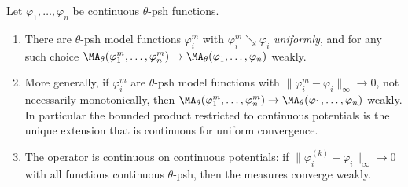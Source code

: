 \begin{proposition}
\label{prop:ch24-continuous-uniform}
Let \(\varphi_1,\ldots,\varphi_n\) be continuous \(\theta\)-psh functions.
\begin{enumerate}
\item\label{itm:ch24-cu:seq} There are \(\theta\)-psh model functions
 \(\varphi_i^m\) with \(\varphi_i^m\searrow\varphi_i\) \emph{uniformly}, and
 for any such choice
 \(\MA_\theta(\varphi_1^m,\ldots,\varphi_n^m)\to
   \MA_\theta(\varphi_1,\ldots,\varphi_n)\) weakly.
\item\label{itm:ch24-cu:unif} More generally, if \(\varphi_i^m\) are
 \(\theta\)-psh model functions with
 \(\|\varphi_i^m-\varphi_i\|_\infty\to0\), not necessarily monotonically,
 then \(\MA_\theta(\varphi_1^m,\ldots,\varphi_n^m)\to
 \MA_\theta(\varphi_1,\ldots,\varphi_n)\) weakly.  In particular the
 bounded product restricted to continuous potentials is the unique
 extension that is continuous for uniform convergence.
\item\label{itm:ch24-cu:cont} The operator is continuous on continuous
 potentials: if \(\|\varphi_i^{(k)}-\varphi_i\|_\infty\to0\) with all
 functions continuous \(\theta\)-psh, then the measures converge weakly.
\end{enumerate}
\end{proposition}

